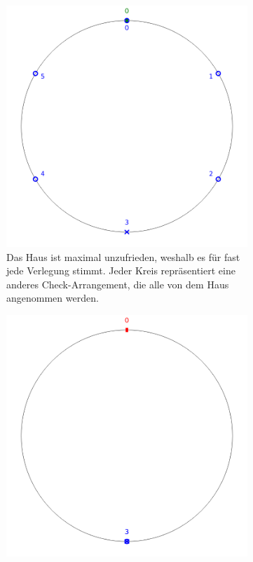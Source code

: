\documentclass[a4paper,10pt,ngerman]{scrartcl}
\begin{document}
\begin{figure}[ht]
    \centering
    \caption{Unzufriedene Häuser}
    \begin{subfigure}[t]{0.4\linewidth}
        \includegraphics[width=\linewidth]{02_unhappy_house.png}
        \caption{Das Haus ist maximal unzufrieden, weshalb es für fast jede Verlegung stimmt. Jeder Kreis repräsentiert eine anderes Check-Arrangement, die alle von dem Haus angenommen werden.}
        \label{fig:02_unhappy_house}
    \end{subfigure}
    \begin{subfigure}[t]{0.4\linewidth}
        \includegraphics[width=\linewidth]{03_slightly_happy_house.png}

\end{subfigure}
\end{figure}
\end{document}
